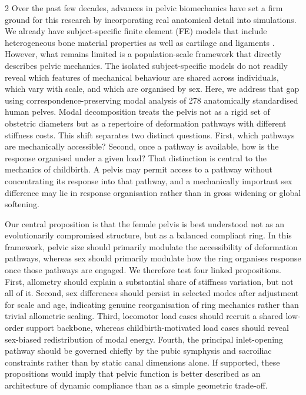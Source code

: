 \documentclass[openacc]{rsproca_new}
\begin{document}
\begin{multicols}{2}
Over the past few decades, advances in pelvic biomechanics have set a firm ground for this research by incorporating real anatomical detail into simulations. We already have subject-specific finite element (FE) models that include heterogeneous bone material properties as well as cartilage and ligaments \cite{Eichenseer2011,Hammer2013}. However, what remains limited is a population-scale framework that directly describes pelvic mechanics. The isolated subject-specific models do not readily reveal which features of mechanical behaviour are shared across individuals, which vary with scale, and which are organised by sex. Here, we address that gap using correspondence-preserving modal analysis of 278 anatomically standardised human pelves. Modal decomposition treats the pelvis not as a rigid set of obstetric diameters but as a repertoire of deformation pathways with different stiffness costs. This shift separates two distinct questions. First, which pathways are mechanically accessible? Second, once a pathway is available, how is the response organised under a given load? That distinction is central to the mechanics of childbirth. A pelvis may permit access to a pathway without concentrating its response into that pathway, and a mechanically important sex difference may lie in response organisation rather than in gross widening or global softening.

Our central proposition is that the female pelvis is best understood not as an evolutionarily compromised structure, but as a balanced compliant ring. In this framework, pelvic size should primarily modulate the accessibility of deformation pathways, whereas sex should primarily modulate how the ring organises response once those pathways are engaged. We therefore test four linked propositions. First, allometry should explain a substantial share of stiffness variation, but not all of it. Second, sex differences should persist in selected modes after adjustment for scale and age, indicating genuine reorganisation of ring mechanics rather than trivial allometric scaling. Third, locomotor load cases should recruit a shared low-order support backbone, whereas childbirth-motivated load cases should reveal sex-biased redistribution of modal energy. Fourth, the principal inlet-opening pathway should be governed chiefly by the pubic symphysis and sacroiliac constraints rather than by static canal dimensions alone. If supported, these propositions would imply that pelvic function is better described as an architecture of dynamic compliance than as a simple geometric trade-off.


\end{multicols}
\end{document}
